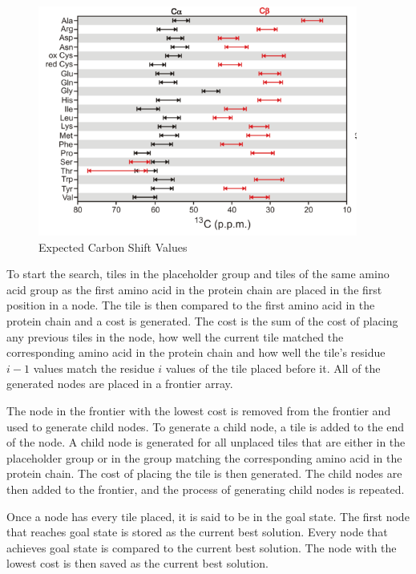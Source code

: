 \documentclass[12pt]{article}
\begin{document}
\begin{figure}[H]
\begin{center}
\includegraphics{carbon}
\end{center}
\caption{Expected Carbon Shift Values} %
\label{fig:carbon}
\end{figure}

To start the search, tiles in the placeholder group and tiles of the same amino acid group as the first amino acid in the protein chain are placed in the first position in a node. The tile is then compared to the first amino acid in the protein chain and a cost is generated. The cost is the sum of the cost of placing any previous tiles in the node, how well the current tile matched the corresponding amino acid in the protein chain and how well the tile's residue $i-1$ values match the residue $i$ values of the tile placed before it. All of the generated nodes are placed in a frontier array. 

The node in the frontier with the lowest cost is removed from the frontier and used to generate child nodes. To generate a child node, a tile is added to the end of the node. A child node is generated for all unplaced tiles that are either in the placeholder group or in the group matching the corresponding amino acid in the protein chain. The cost of placing the tile is then generated.  The child nodes are then added to the frontier, and the process of generating child nodes is repeated. 

Once a node has every tile placed, it is said to be in the goal state. The first node that reaches goal state is stored as the current best solution. Every node that achieves goal state is compared to the current best solution. The node with the lowest cost is then saved as the current best solution. 
\end{document}

